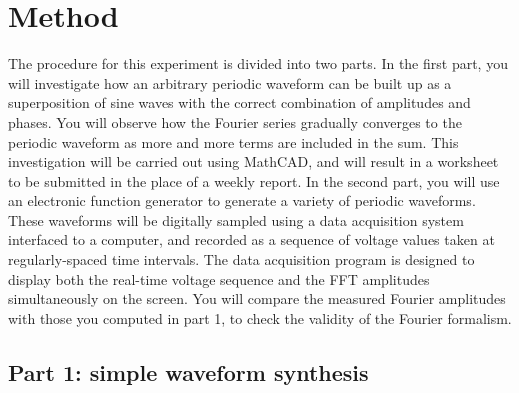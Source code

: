 \documentclass{revtex4}
\begin{document}

\section{Method}

The procedure for this experiment is divided into two parts.  In the first
part, you will investigate how an arbitrary periodic waveform can be built
up as a superposition of sine waves with the correct combination of amplitudes
and phases.  You will observe how the Fourier series gradually converges to
the periodic waveform as more and more terms are included in the sum.
This investigation will be carried out using MathCAD, and will
result in a worksheet to be submitted in the place of a weekly report.  In
the second part, you will use an electronic function generator to generate
a variety of periodic waveforms.  These waveforms will be digitally sampled
using a data acquisition system interfaced to a computer, and recorded as
a sequence of voltage values taken at regularly-spaced time intervals.
The data acquisition program is designed to display both the real-time
voltage sequence and the FFT amplitudes simultaneously on the screen.  You
will compare the measured Fourier amplitudes with those you computed in part
1, to check the validity of the Fourier formalism.

\subsection{Part 1: simple waveform synthesis}
\end{document}
